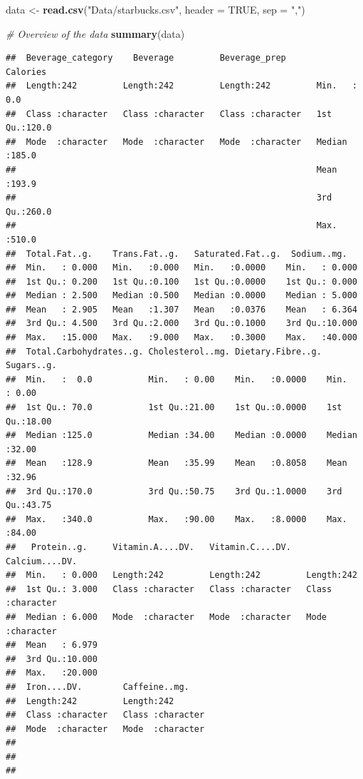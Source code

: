 \documentclass[
]{article}
\newenvironment{Shaded}{\begin{snugshade}}{\end{snugshade}}
\newcommand{\AttributeTok}[1]{\textcolor[rgb]{0.13,0.29,0.53}{#1}}
\newcommand{\CommentTok}[1]{\textcolor[rgb]{0.56,0.35,0.01}{\textit{#1}}}
\newcommand{\ConstantTok}[1]{\textcolor[rgb]{0.56,0.35,0.01}{#1}}
\newcommand{\FunctionTok}[1]{\textcolor[rgb]{0.13,0.29,0.53}{\textbf{#1}}}
\newcommand{\NormalTok}[1]{#1}
\newcommand{\OtherTok}[1]{\textcolor[rgb]{0.56,0.35,0.01}{#1}}
\newcommand{\StringTok}[1]{\textcolor[rgb]{0.31,0.60,0.02}{#1}}
\begin{document}
\begin{Shaded}
\begin{Highlighting}[]
\NormalTok{data }\OtherTok{\textless{}{-}} \FunctionTok{read.csv}\NormalTok{(}\StringTok{"Data/starbucks.csv"}\NormalTok{, }\AttributeTok{header =} \ConstantTok{TRUE}\NormalTok{, }\AttributeTok{sep =} \StringTok{","}\NormalTok{)}

\CommentTok{\# Overview of the data}
\FunctionTok{summary}\NormalTok{(data)}
\end{Highlighting}
\end{Shaded}

\begin{verbatim}
##  Beverage_category    Beverage         Beverage_prep         Calories    
##  Length:242         Length:242         Length:242         Min.   :  0.0  
##  Class :character   Class :character   Class :character   1st Qu.:120.0  
##  Mode  :character   Mode  :character   Mode  :character   Median :185.0  
##                                                           Mean   :193.9  
##                                                           3rd Qu.:260.0  
##                                                           Max.   :510.0  
##  Total.Fat..g.    Trans.Fat..g.   Saturated.Fat..g.  Sodium..mg.    
##  Min.   : 0.000   Min.   :0.000   Min.   :0.0000    Min.   : 0.000  
##  1st Qu.: 0.200   1st Qu.:0.100   1st Qu.:0.0000    1st Qu.: 0.000  
##  Median : 2.500   Median :0.500   Median :0.0000    Median : 5.000  
##  Mean   : 2.905   Mean   :1.307   Mean   :0.0376    Mean   : 6.364  
##  3rd Qu.: 4.500   3rd Qu.:2.000   3rd Qu.:0.1000    3rd Qu.:10.000  
##  Max.   :15.000   Max.   :9.000   Max.   :0.3000    Max.   :40.000  
##  Total.Carbohydrates..g. Cholesterol..mg. Dietary.Fibre..g.   Sugars..g.   
##  Min.   :  0.0           Min.   : 0.00    Min.   :0.0000    Min.   : 0.00  
##  1st Qu.: 70.0           1st Qu.:21.00    1st Qu.:0.0000    1st Qu.:18.00  
##  Median :125.0           Median :34.00    Median :0.0000    Median :32.00  
##  Mean   :128.9           Mean   :35.99    Mean   :0.8058    Mean   :32.96  
##  3rd Qu.:170.0           3rd Qu.:50.75    3rd Qu.:1.0000    3rd Qu.:43.75  
##  Max.   :340.0           Max.   :90.00    Max.   :8.0000    Max.   :84.00  
##   Protein..g.     Vitamin.A....DV.   Vitamin.C....DV.   Calcium....DV.    
##  Min.   : 0.000   Length:242         Length:242         Length:242        
##  1st Qu.: 3.000   Class :character   Class :character   Class :character  
##  Median : 6.000   Mode  :character   Mode  :character   Mode  :character  
##  Mean   : 6.979                                                           
##  3rd Qu.:10.000                                                           
##  Max.   :20.000                                                           
##  Iron....DV.        Caffeine..mg.     
##  Length:242         Length:242        
##  Class :character   Class :character  
##  Mode  :character   Mode  :character  
##                                       
##                                       
## 
\end{verbatim}
\end{document}
